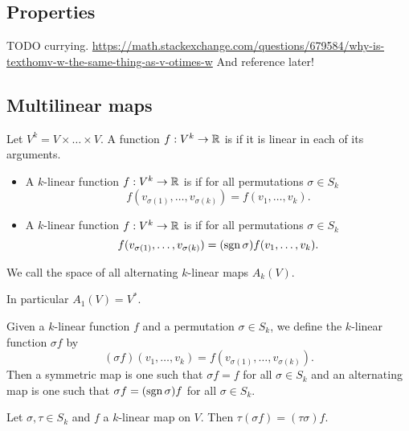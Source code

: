 \subsection{Properties}
TODO currying.
\url{https://math.stackexchange.com/questions/679584/why-is-texthomv-w-the-same-thing-as-v-otimes-w}
And reference later!
\subsection{Multilinear maps}
\begin{definition}
Let $V^k = V\times \ldots \times V$. A function $f: V^k\to \mathbb{R}$ is  if it is linear in each of its arguments.
\begin{itemize}
\item A $k$-linear function $f:V^k\to \mathbb{R}$ is  if for all permutations $\sigma\in S_k$
\[ f(v_{\sigma(1)},\ldots, v_{\sigma(k)}) = f(v_1,\ldots, v_k). \]
\item A $k$-linear function $f:V^k\to \mathbb{R}$ is  if for all permutations $\sigma\in S_k$
\[ f(v_{\sigma(1)},\ldots, v_{\sigma(k)}) = (\operatorname{sgn}\sigma)f(v_1,\ldots, v_k). \]
\end{itemize}
We call the space of all alternating $k$-linear maps $A_k(V)$.
\end{definition}
In particular $A_1(V) = V^*$.
\begin{note}
Given a $k$-linear function $f$ and a permutation $\sigma\in S_k$, we define the $k$-linear function $\sigma f$ by
\[ (\sigma f)(v_1,\ldots, v_k) = f(v_{\sigma(1)},\ldots, v_{\sigma(k)}). \]
Then a symmetric map is one such that $\sigma f = f$ for all $\sigma\in S_k$ and an alternating map is one such that $\sigma f = (\operatorname{sgn} \sigma)f$ for all $\sigma\in S_k$.
\end{note} 
\begin{lemma}
Let $\sigma,\tau \in S_k$ and $f$ a $k$-linear map on $V$. Then $\tau(\sigma f) = (\tau \sigma)f$.
\end{lemma}
